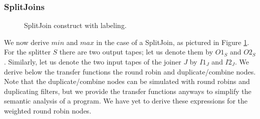 \subsubsection{SplitJoins}

\begin{figure}
\centering
{}
\caption{\protect\small SplitJoin construct with labeling.
\protect\label{splitjoin}}
\end{figure}

We now derive $min$ and $max$ in the case of a SplitJoin, as pictured
in Figure \ref{splitjoin}.  For the splitter $S$ there are two output
tapes; let us denote them by $O1_S$ and $O2_S$.  Similarly, let us
denote the two input tapes of the joiner $J$ by $I1_J$ and $I2_J$.  We
derive below the transfer functions the round robin and
duplicate/combine nodes.  Note that the duplicate/combine nodes can be
simulated with round robins and duplicating filters, but we provide
the transfer functions anyways to simplify the semantic analysis of a
program.  We have yet to derive these expressions for the weighted
round robin nodes.

